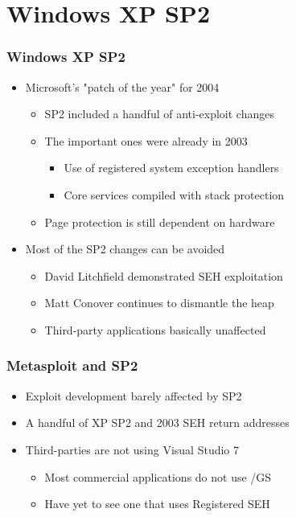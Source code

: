 \documentclass{beamer}
\newenvironment{sitemize}{\vspace{1mm}\begin{itemize}\itemsep 4pt\small}{\end{itemize}}
\begin{document}
\section{Windows XP SP2}
\begin{frame}[t]
  \frametitle{Windows XP SP2}
	\begin{sitemize}
		\item Microsoft's "patch of the year" for 2004
		\begin{sitemize}
			\item SP2 included a handful of anti-exploit changes
			\item The important ones were already in 2003
			\begin{sitemize}
				\item Use of registered system exception handlers
				\item Core services compiled with stack protection
			\end{sitemize}
			\item Page protection is still dependent on hardware
		\end{sitemize}	
	\end{sitemize}
	
	\pause
	\begin{sitemize}
		\item Most of the SP2 changes can be avoided
		\begin{sitemize}
			\item David Litchfield demonstrated SEH exploitation
			\item Matt Conover continues to dismantle the heap
			\item Third-party applications basically unaffected
		\end{sitemize}
	\end{sitemize}
\end{frame}

\begin{frame}[t]
  \frametitle{Metasploit and SP2}
	\begin{sitemize}
		\item Exploit development barely affected by SP2
		\item A handful of XP SP2 and 2003 SEH return addresses
		\item Third-parties are not using Visual Studio 7
		\begin{sitemize}
			\item Most commercial applications do not use /GS
			\item Have yet to see one that uses Registered SEH
		\end{sitemize}
	\end{sitemize}
\end{frame}
\end{document}
